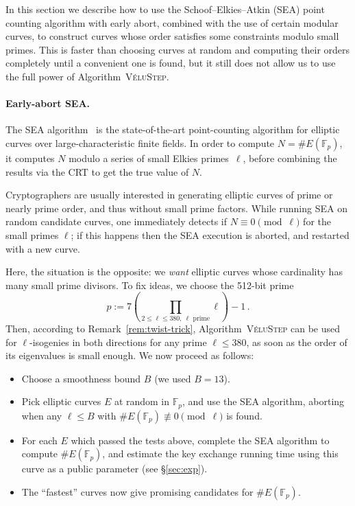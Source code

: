 \documentclass{llncs}
\newcommand{\F}{\mathbb{F}}
\newcommand{\algstyle}[1]{\textsc{#1}}
\begin{document}
In this section we describe how to use the Schoof--Elkies--Atkin (SEA) point counting
algorithm with early abort, combined with the use of certain modular curves,
to construct curves whose order satisfies some constraints
modulo small primes.
This is faster than choosing curves at random and computing their orders
completely until a convenient one is found, but it still does not allow us
to use the full power of Algorithm~\algstyle{VéluStep}.

\paragraph{Early-abort SEA.}
The SEA algorithm~\cite{schoof95,Morain95}
is the state-of-the-art point-count\-ing algorithm
for elliptic curves over large-characteristic finite fields.
In order to compute $N = \# E(\F_p)$, it computes $N$ modulo a series
of small Elkies primes~$\ell$, before combining the results via the CRT
to get the true value of $N$.

Cryptographers are usually interested in generating elliptic curves of
prime or nearly prime order, and thus without small prime factors.
While running SEA on random candidate curves,
one immediately detects if $N \equiv 0\pmod{\ell}$
for the small primes $\ell$;
if this happens then the SEA execution is aborted, and restarted with a new curve.

Here, the situation is the opposite: we \emph{want} elliptic curves
whose cardinality has many small prime divisors.
To fix ideas, we choose the 512-bit prime
\[
    p 
    := 
    7 \left(
        \prod_{2\leq\ell\leq 380,\ \ell \text{ prime}} \ell
    \right) - 1
    \,.
\]
Then, according to Remark~\ref{rem:twist-trick},
Algorithm~\algstyle{VéluStep} can be used for $\ell$-isogenies in both
directions for any prime $\ell\leq 380$, as soon as the order of its
eigenvalues is small enough.
We now proceed as follows:
\begin{itemize}
    \item 
        Choose a smoothness bound $B$ (we used $B = 13$).
    \item 
        Pick elliptic curves $E$ at random in $\F_p$, and use the SEA algorithm,
        aborting when any $\ell\leq B$ 
        with $\#E(\F_p) \not\equiv 0\pmod{\ell}$ is found.
    \item 
        For each $E$ which passed the tests above, 
        complete the SEA algorithm to compute $\#E(\F_p)$, 
        and estimate the key exchange running time 
        using this curve as a public parameter (see \S\ref{sec:exp}).
    \item
        The ``fastest'' curves now give promising candidates for $\#E(\F_p)$.
\end{itemize}
\end{document}
